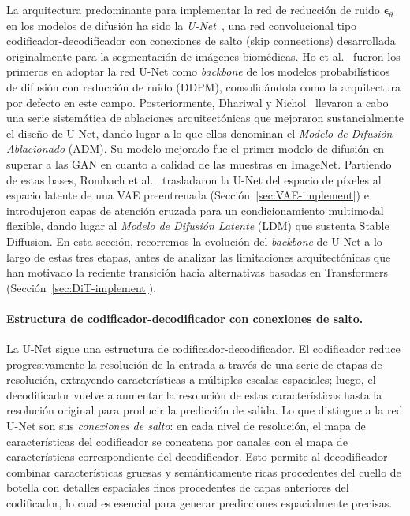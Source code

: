 \documentclass[../../book-main_es.tex]{subfiles}
\begin{document}
La arquitectura predominante para implementar la red de reducción de ruido $\boldsymbol{\epsilon}_\theta$ 
en los modelos de difusión ha sido la \textit{U-Net}~\citep{ronneberger2015unet}, una red convolucional tipo 
codificador-decodificador con conexiones de salto (skip connections) desarrollada originalmente para la segmentación de 
imágenes biomédicas. Ho et al.~\citep{ho2020denoising} fueron los primeros en adoptar la red U-Net como 
\textit{backbone} de los modelos probabilísticos de difusión con reducción de ruido (DDPM), 
consolidándola como la arquitectura por defecto en este campo. Posteriormente, Dhariwal 
y Nichol~\citep{dhariwal2021diffusion} llevaron a cabo una serie sistemática de ablaciones arquitectónicas 
que mejoraron sustancialmente el diseño de U-Net, dando lugar a lo que ellos denominan 
el \emph{Modelo de Difusión Ablacionado} (ADM). Su modelo mejorado fue el primer modelo de difusión 
en superar a las GAN en cuanto a calidad de las muestras en ImageNet. Partiendo de estas bases, 
Rombach et al.~\citep{rombach2022high} trasladaron la U-Net del espacio de píxeles al espacio latente 
de una VAE preentrenada (Sección~\ref{sec:VAE-implement}) e introdujeron capas de atención cruzada para 
un condicionamiento multimodal flexible, dando lugar al \emph{Modelo de Difusión Latente} (LDM) que 
sustenta Stable Diffusion. En esta sección, recorremos la evolución del \textit{backbone} de U-Net 
a lo largo de estas tres etapas, antes de analizar las limitaciones arquitectónicas que han motivado 
la reciente transición hacia alternativas basadas en Transformers (Sección~\ref{sec:DiT-implement}).

\paragraph{Estructura de codificador-decodificador con conexiones de salto.}
La U-Net sigue una estructura de codificador-decodificador. El codificador reduce progresivamente la 
resolución de la entrada a través de una serie de etapas de resolución, extrayendo características 
a múltiples escalas espaciales; luego, el decodificador vuelve a aumentar la resolución de estas 
características hasta la resolución original para producir la predicción de salida. Lo que distingue 
a la red U-Net son sus \emph{conexiones de salto}: en cada nivel de resolución, el mapa de 
características del codificador se concatena por canales con el mapa de características correspondiente 
del decodificador. Esto permite al decodificador combinar características gruesas y semánticamente 
ricas procedentes del cuello de botella con detalles espaciales finos procedentes de capas 
anteriores del codificador, lo cual es esencial para generar predicciones espacialmente precisas.
\end{document}
